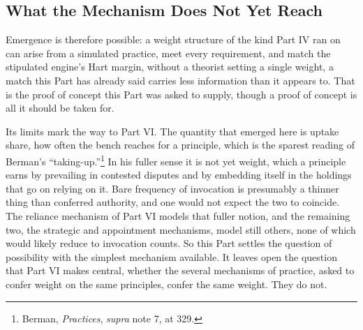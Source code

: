 \subsection{What the Mechanism Does Not Yet Reach}

Emergence is therefore possible: a weight structure of the kind Part IV
ran on can arise from a simulated practice, meet every requirement, and match
the stipulated engine's Hart margin, without a theorist setting a
single weight, a match this Part has already said carries less information
than it appears to. That is the proof of concept this Part was asked to supply, though a proof
of concept is all it should be taken for.

Its limits mark the way to Part VI. The quantity that emerged here is
uptake share, how often the bench reaches for a principle, which is the
sparest reading of Berman's ``taking-up.''\footnote{Berman,
\textit{Practices}, \textit{supra} note 7, at 329.} In his fuller sense it is not yet weight, which a principle earns by
prevailing in contested disputes and by embedding itself in the holdings
that go on relying on it. Bare frequency of invocation is presumably a thinner thing than conferred
authority, and one would not expect the two to coincide. The reliance mechanism of Part VI models that fuller notion, and the remaining two,
the strategic and appointment mechanisms, model still others, none of which would likely
reduce to invocation counts. So this Part settles the question of possibility with the simplest
mechanism available. It leaves open the question that Part VI makes
central, whether the several mechanisms of
practice, asked to confer weight on the same principles, confer the same
weight. They do not.
